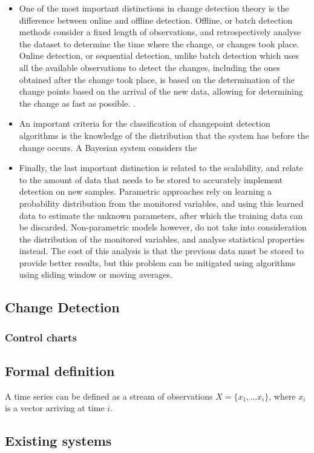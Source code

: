 \begin {itemize}
    \item One of the most important distinctions in change detection theory is the difference between online and offline detection. Offline, or batch detection methods consider a fixed length of observations, and retrospectively 
analyse the dataset to determine the time where the change, or changes took place. Online detection, or sequential detection, unlike batch detection which uses all the available observations to detect the changes, including the
ones obtained after the change took place, is based on the determination of the change points based on the arrival of the new data, allowing for determining the change as fast as possible.
\cite { CITE - http://citeseerx.ist.psu.edu/viewdoc/download?doi=10.1.1.425.1477&rep=rep1&type=pdf}. 
    \item An important criteria for the classification of changepoint detection algorithms is the knowledge of the distribution that the system has before the change occurs. A Bayesian system considers the 
    \item Finally, the last important distinction is related to the scalability, and relate to the amount of data that needs to be stored to accurately implement detection on new samples. Parametric approaches rely on learning a 
probability distribution from the monitored variables, and using this learned data to estimate the unknown parameters, after which the training data can be discarded. Non-parametric models however, do not take into consideration the
distribution of the monitored variables, and analyse statistical properties instead. The cost of this analysis is that the previous data must be stored to provide better results, but this problem can be mitigated using 
algorithms using sliding window or moving averages.
\end {itemize}

\subsection {Change Detection}
\subsubsection {Control charts}
\subsection {Formal definition}

A time series can be defined as a stream of observations $X = \{x_1, ... x_i\}$, where $x_i$ is a vector arriving at time $i$. 
\subsection {Existing systems}
